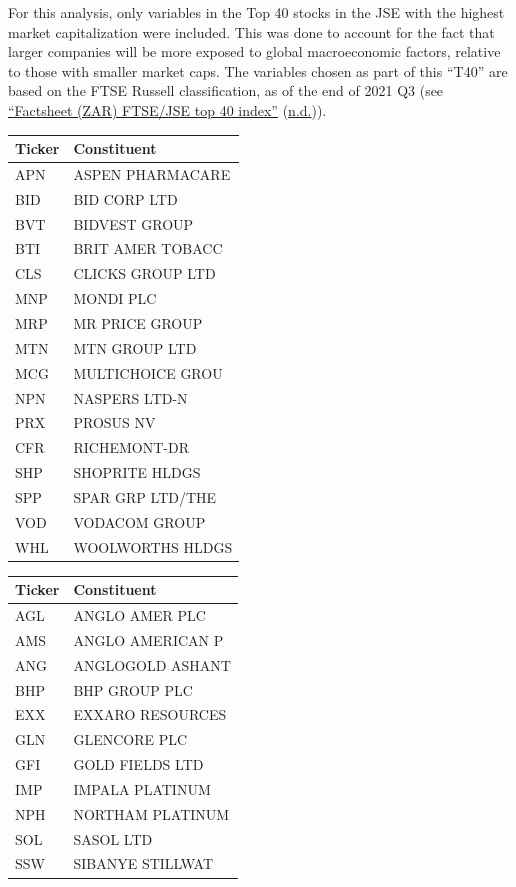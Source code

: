 \documentclass[11pt,preprint, authoryear]{elsarticle}
\let\origtable\table
\let\endorigtable\endtable
\renewenvironment{table}[1][2] {
    \expandafter\origtable\expandafter[H]
} {
    \endorigtable
}
\numberwithin{equation}{section}
\numberwithin{figure}{section}
\numberwithin{table}{section}
\begin{document}
For this analysis, only variables in the Top 40 stocks in the JSE with
the highest market capitalization were included. This was done to
account for the fact that larger companies will be more exposed to
global macroeconomic factors, relative to those with smaller market
caps. The variables chosen as part of this ``T40'' are based on the FTSE
Russell classification, as of the end of 2021 Q3 (see
\protect\hyperlink{ref-FTSE}{{``Factsheet (ZAR) FTSE/JSE top 40
index''}} (\protect\hyperlink{ref-FTSE}{n.d.})).

\begin{table}[H]

\caption{\label{tab:unnamed-chunk-1}T40 Constituents: Industrials}
\centering
\begin{tabular}[t]{l|l}
\hline
Ticker & Constituent\\
\hline
APN & ASPEN PHARMACARE\\
\hline
BID & BID CORP LTD\\
\hline
BVT & BIDVEST GROUP\\
\hline
BTI & BRIT AMER TOBACC\\
\hline
CLS & CLICKS GROUP LTD\\
\hline
MNP & MONDI PLC\\
\hline
MRP & MR PRICE GROUP\\
\hline
MTN & MTN GROUP LTD\\
\hline
MCG & MULTICHOICE GROU\\
\hline
NPN & NASPERS LTD-N\\
\hline
PRX & PROSUS NV\\
\hline
CFR & RICHEMONT-DR\\
\hline
SHP & SHOPRITE HLDGS\\
\hline
SPP & SPAR GRP LTD/THE\\
\hline
VOD & VODACOM GROUP\\
\hline
WHL & WOOLWORTHS HLDGS\\
\hline
\end{tabular}
\end{table}

\begin{table}[H]

\caption{\label{tab:unnamed-chunk-2}T40 Constituents: Resources}
\centering
\begin{tabular}[t]{l|l}
\hline
Ticker & Constituent\\
\hline
AGL & ANGLO AMER PLC\\
\hline
AMS & ANGLO AMERICAN P\\
\hline
ANG & ANGLOGOLD ASHANT\\
\hline
BHP & BHP GROUP PLC\\
\hline
EXX & EXXARO RESOURCES\\
\hline
GLN & GLENCORE PLC\\
\hline
GFI & GOLD FIELDS LTD\\
\hline
IMP & IMPALA PLATINUM\\
\hline
NPH & NORTHAM PLATINUM\\
\hline
SOL & SASOL LTD\\
\hline
SSW & SIBANYE STILLWAT\\
\hline
\end{tabular}
\end{table}
\end{document}
